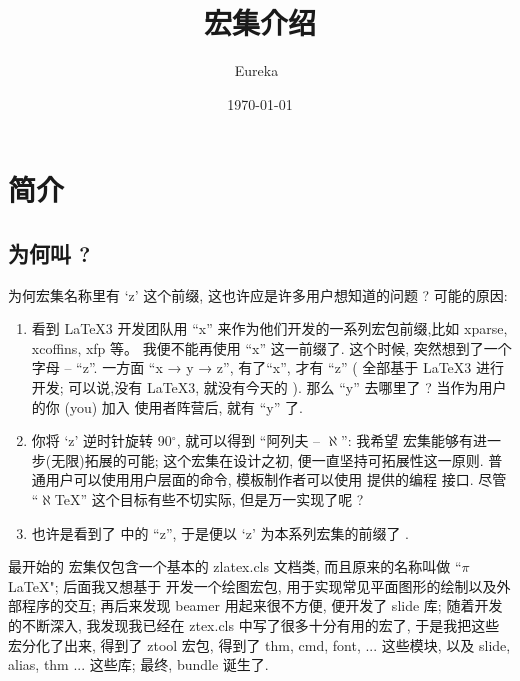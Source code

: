 \documentclass[
  hyper, lang=cn,
  classOption = {11pt},
  mathSpec={envStyle=leftbar},
]{../../zlatex/code/ztex}
\title{\texorpdfstring{\zTeX{}}{zTeX} 宏集介绍}
\author{Eureka~\rlap{\wscale*{7.5em}{\normalfont\small\sffamily\color{gray}zongpingding5(at)outlook(dot)com}}}
\date{\textsf{\today}}
\newcommand{\pkg}[1]{\textsf{#1}}
\newcommand{\cls}[1]{\textsf{#1}}
\begin{document}
\ExplSyntaxOn
{}
\ExplSyntaxOff
\maketitle
\thispagestyle{empty}
\tableofcontents
\clearpage


\section{简介}
\subsection{为何叫 \texorpdfstring{\ztex}{zTeX}?}
为何宏集名称里有 `z' 这个前缀, 这也许应是许多用户想知道的问题 ? 可能的原因:

\begin{enumerate}[(1)]
  \item 看到 \LaTeX3 开发团队用 ``x'' 来作为他们开发的一系列宏包前缀,比如 \pkg{xparse}, \pkg{xcoffins}, \pkg{xfp} 等。
    我便不能再使用 ``x'' 这一前缀了. 这个时候, 突然想到了一个字母 -- ``z''. 一方面 ``x → y → z'', 有了``x'', 才有 ``z''
    (\zTeX{} 全部基于 \LaTeX3 进行开发; 可以说,没有 \LaTeX3, 就没有今天的 \zTeX{}). 那么 ``y'' 去哪里了 ? 当作为用户的你 (you) 
    加入 \zTeX{} 使用者阵营后, 就有 ``y'' 了.
  \item 你将 `z' 逆时针旋转 90$^\circ$, 就可以得到 ``阿列夫 -- $\aleph$'': 我希望 \zTeX{} 宏集能够有进一步(无限)拓展的可能;
    这个宏集在设计之初, 便一直坚持可拓展性这一原则. 普通用户可以使用用户层面的命令, 模板制作者可以使用 \ztex{} 提供的编程
    接口. 尽管 ``$\aleph$\TeX'' 这个目标有些不切实际, 但是万一实现了呢 ?
  \item 也许是看到了 \TikZ{} 中的 ``z'', 于是便以 `z' 为本系列宏集的前缀了 .
\end{enumerate}

最开始的 \ztex{} 宏集仅包含一个基本的 \cls{zlatex.cls} 文档类, 而且原来的名称叫做 ``$\pi$\LaTeX{}"; 后面我又想基于 \TikZ{} 
开发一个绘图宏包, 用于实现常见平面图形的绘制以及外部程序的交互; 再后来发现 beamer 用起来很不方便, 便开发了 \pkg{slide} 库;
随着开发的不断深入, 我发现我已经在 \cls{ztex.cls} 中写了很多十分有用的宏了, 于是我把这些宏分化了出来, 得到了 \pkg{ztool} 宏包,
得到了 \pkg{thm}, \pkg{cmd}, \pkg{font}, ... 这些模块, 以及 \pkg{slide}, \pkg{alias}, \pkg{thm} ... 这些库; 最终, 
\ztex{} bundle 诞生了.
\end{document}
